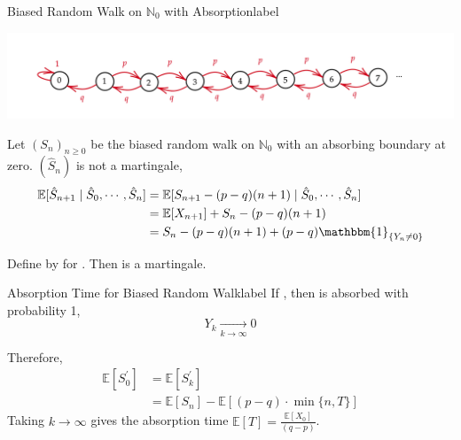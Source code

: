 \documentclass{tufte-handout}
\begin{document}
\begin{ex}{Biased Random Walk on $\mathbb{N}_0$ with Absorption}{label}
    \begin{center}
      \includegraphics[width=\textwidth]{fig-27.png}
    \end{center}
    Let $(S_n)_{n \geq 0}$ be the biased random walk on $\mathbb{N}_0$ with an absorbing boundary at zero.  $(\hat{S}_n)$ is not a martingale,
    \begin{align*}
    \mathbb{E}[\hat{S}_{n+1} \mid \hat{S}_0, \cdots, \hat{S}_n]
    &= \mathbb{E}[S_{n+1} - (p - q)(n+1) \mid \hat{S}_0, \cdots, \hat{S}_n] \\
    &= \mathbb{E}[X_{n+1}] + S_n - (p - q)(n+1) \\
    &= S_n - (p - q)(n+1) + (p - q) \mathbbm{1}_{\{Y_n \neq 0\}}
    \end{align*}
    
    \noindent Define  by  for . Then  is a martingale.
\end{ex}

\begin{ex}{Absorption Time for Biased Random Walk}{label}
  If , then  is absorbed with probability 1, 
    \[Y_{k} \underset{k \rightarrow \infty}{\rightarrow} 0\]
  
  \noindent Therefore,
  \begin{align*}
    \mathbb{E}[S^{\prime}_0] &= \mathbb{E}[S^{\prime}_k] \\
                             &= \mathbb{E}[S_n] - \mathbb{E}[(p - q) \cdot \min \{n, T\}]
  \end{align*}
  \noindent Taking $k \rightarrow \infty$ gives the absorption time $\mathbb{E}[T] = \frac{\mathbb{E}[X_0]}{(q - p)}$.
\end{ex}
\end{document}
